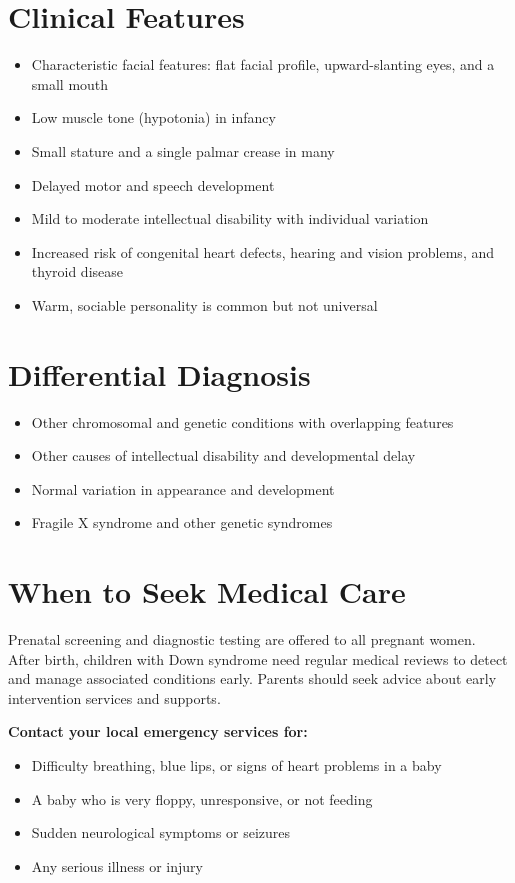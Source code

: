 \section*{Clinical Features}
\begin{itemize}
    \item Characteristic facial features: flat facial profile, upward-slanting eyes, and a small mouth
    \item Low muscle tone (hypotonia) in infancy
    \item Small stature and a single palmar crease in many
    \item Delayed motor and speech development
    \item Mild to moderate intellectual disability with individual variation
    \item Increased risk of congenital heart defects, hearing and vision problems, and thyroid disease
    \item Warm, sociable personality is common but not universal
\end{itemize}

\section*{Differential Diagnosis}
\begin{itemize}
    \item Other chromosomal and genetic conditions with overlapping features
    \item Other causes of intellectual disability and developmental delay
    \item Normal variation in appearance and development
    \item Fragile X syndrome and other genetic syndromes
\end{itemize}

\section*{When to Seek Medical Care}
Prenatal screening and diagnostic testing are offered to all pregnant women. After birth, children with Down syndrome need regular medical reviews to detect and manage associated conditions early. Parents should seek advice about early intervention services and supports.

\textbf{Contact your local emergency services for:}
\begin{itemize}
    \item Difficulty breathing, blue lips, or signs of heart problems in a baby
    \item A baby who is very floppy, unresponsive, or not feeding
    \item Sudden neurological symptoms or seizures
    \item Any serious illness or injury
\end{itemize}

